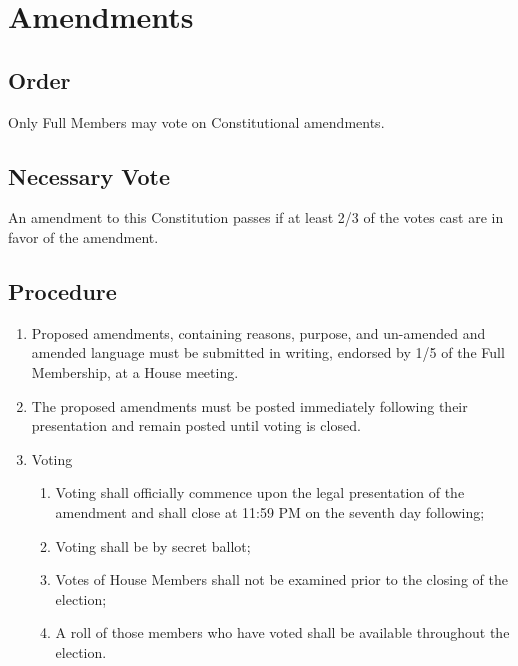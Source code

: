 \documentclass[10pt]{article} %
\begin{document}
\section{Amendments}
\subsection{Order}
Only Full Members may vote on Constitutional amendments.
\subsection{Necessary Vote}
An amendment to this Constitution passes if at least 2/3 of the votes cast are in favor of the amendment.
\subsection{Procedure}
\begin{enumerate}
\item Proposed amendments, containing reasons, purpose, and un-amended and amended language must be submitted in writing, endorsed by 1/5 of the Full Membership, at a House meeting.
\item The proposed amendments must be posted immediately following their presentation and remain posted until voting is closed.
\item Voting
\begin{enumerate}
\item Voting shall officially commence upon the legal presentation of the amendment and shall close at 11:59 PM on the seventh day following;
\item Voting shall be by secret ballot;
\item Votes of House Members shall not be examined prior to the closing of the election;
\item A roll of those members who have voted shall be available throughout the election.
\end{enumerate}
\end{enumerate}
\end{document}
